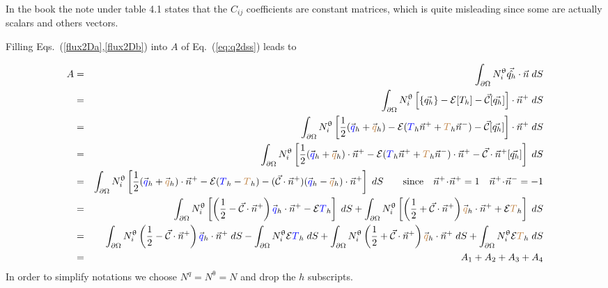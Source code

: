 \begin{itemize}
\begin{remark}
In the book the note under table 4.1 states that the $C_{ij}$ 
coefficients are constant matrices, which is quite misleading since some are actually scalars and others vectors.
\end{remark}

\end{itemize}


Filling Eqs.~(\ref{flux2Da},\ref{flux2Db}) into $A$ of Eq.~(\ref{eq:q2dss}) leads to


\begin{eqnarray}
A&=& \int_{\partial\Omega} N^\uptheta_i \vec{\hat{q_h}} \cdot \vec{n} \; dS \nonumber\\ 
&=&
\int_{\partial\Omega} N^\uptheta_i \left[ \{ \vec{q_h} \} -{\cal{E}} [T_h]- \vec{\cal{C}}  [\vec{q_h}] \right] \cdot \vec{n}^+ \; dS  \nonumber\\
&=&
\int_{\partial\Omega}{N^\uptheta_i} \left[ \frac{1}{2}(\vec{\color{blue}q}_h + \vec{\color{brown}q}_h) 
-{\cal{E}} ({\color{blue} T}_h \vec{n}^+ + {\color{brown} T}_h \vec{n}^-)- \vec{\cal{C}}  [\vec{q_h}] \right] \cdot \vec{n}^+ \; dS  \nonumber\\
&=&
\int_{\partial\Omega}{N^\uptheta_i} \left[ \frac{1}{2}(\vec{\color{blue}q}_h + \vec{\color{brown}q}_h)\cdot\vec{n}^+ 
  -{\cal{E}} ({\color{blue} T}_h \vec{n}^+ + {\color{brown} T}_h \vec{n}^-) \cdot \vec{n}^+
- \vec{\cal{C}} \cdot \vec{n}^+ [\vec{q_h}] \right] \; dS  \nonumber\\
&=&
\int_{\partial\Omega}{N^\uptheta_i} \left[ \frac{1}{2}(\vec{\color{blue}q}_h + \vec{\color{brown}q}_h)\cdot\vec{n}^+  -{\cal{E}} ({\color{blue} T}_h -{\color{brown} T}_h ) 
- (\vec{\cal{C}} \cdot \vec{n}^+) 
(\vec{\color{blue}q}_h - \vec{\color{brown}q}_h) \cdot \vec{n}^+
\right] \; dS  \qquad \text{since} \quad  \vec{n}^+\!\cdot\!\vec{n}^+ =1 \quad  \vec{n}^+\!\cdot\!\vec{n}^- =-1 \nonumber\\
&=&
\int_{\partial\Omega}{N^\uptheta_i} \left[
\left(\frac{1}{2} - \vec{\cal{C}} \cdot \vec{n}^+ \right) \vec{\color{blue}q}_h\cdot\vec{n}^+
- {\cal{E}} {\color{blue} T}_h
\right] \; dS 
+ 
\int_{\partial\Omega}{N^\uptheta_i} \left[
\left(\frac{1}{2} + \vec{\cal{C}} \cdot \vec{n}^+ \right)
\vec{\color{brown}q}_h \cdot\vec{n}^+
+ {\cal{E}} {\color{brown} T}_h
\right] \; dS  \nonumber \\
&=&
\int_{\partial\Omega}{N^\uptheta_i} 
\left(\frac{1}{2} - \vec{\cal{C}} \cdot \vec{n}^+ \right) \vec{\color{blue}q}_h\cdot\vec{n}^+ \; dS 
- \int_{\partial\Omega}{N^\uptheta_i}  {\cal{E}} {\color{blue} T}_h  \; dS 
+ 
\int_{\partial\Omega}{N^\uptheta_i} \left(\frac{1}{2} + \vec{\cal{C}} \cdot \vec{n}^+ \right)
\vec{\color{brown}q}_h \cdot\vec{n}^+   \; dS
+
\int_{\partial\Omega}{N^\uptheta_i}   {\cal{E}} {\color{brown} T}_h   \; dS  \nonumber \\
&=& A_1 + A_2 + A_3 + A_4 
\end{eqnarray}
In order to simplify notations we choose $N^q=N^\uptheta=N$ and drop the $h$ subscripts.

